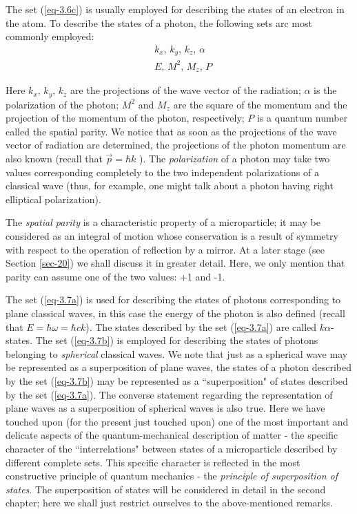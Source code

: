 \documentclass[a4paper,sfsidenotes,colorlinks=true]{tufte-book}
\numberwithin{equation}{section}
\numberwithin{figure}{section}
\begin{document}
The set (\ref{eq-3.6c}) is usually employed for describing the states
of an electron in the atom. To describe the states of a photon, the
following sets arc most commonly employed:
\begin{align}%
& k_{x}, \, k_{y}, \, k_{z},  \, \alpha \tag{3.7a} \label{eq-3.7a}\\
& E, \, M^{2}, \, M_{z}, \, P \tag{3.7b} \label{eq-3.7b}
\end{align}

Here $k_{x}, \, k_{y}, \, k_{z}$ are the projections of the wave
vector of the radiation; $\alpha$ is the polarization of the photon;
$M^{2}$ and $M_{z}$ are the square of the momentum and the projection
of the momentum of the photon, respectively; $P$ is a quantum number
called the spatial parity. We notice that as soon as the projections
of the wave vector of radiation are determined, the projections of the
photon momentum are also known (recall that $\vec{p} = \hbar k$ ).
The \emph{polarization} of a photon may take two values corresponding
completely to the two independent polarizations of a classical wave
(thus, for example, one might talk about a photon having right
elliptical polarization). 

The \emph{spatial parity} is a characteristic property of a
microparticle; it may be considered as an integral of motion whose
conservation is a result of symmetry with respect to the operation of
reflection by a mirror. At a later stage (see Section \ref{sec-20}) we shall
discuss it in greater detail. Here, we only mention that parity can
assume one of the two values: +1 and -1.

The set (\ref{eq-3.7a}) is used for describing the states of photons
corresponding to plane classical waves, in this case the energy of the
photon is also defined (recall that $E = \hbar \omega = \hbar
ck$). The states described by the set (\ref{eq-3.7a}) are called $k
\alpha$-states. The set (\ref{eq-3.7b}) is employed for describing the
states of photons belonging to \emph{spherical} classical waves. We
note that just as a spherical wave may be represented as a
superposition of plane waves, the states of a photon described by the
set (\ref{eq-3.7b}) may be represented as a ``superposition" of states
described by the set (\ref{eq-3.7a}). The converse statement regarding
the representation of plane waves as a superposition of spherical
waves is also true. Here we have touched upon (for the present just
touched upon) one of the most important and delicate aspects of the
quantum-mechanical description of matter - the specific character of
the ``interrelations" between states of a microparticle described by
different complete sets. This specific character is reflected in the
most constructive principle of quantum mechanics - the \emph{principle
  of superposition of states}. The superposition of states will be
considered in detail in the second chapter; here we shall just
restrict ourselves to the above-mentioned remarks.
\end{document}
